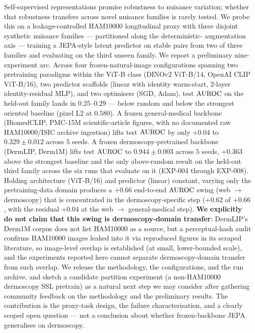 Self-supervised representations promise robustness to nuisance variation; whether
that robustness transfers across novel nuisance families is rarely tested. We
probe this on a leakage-controlled HAM10000 longitudinal proxy with three
disjoint synthetic nuisance families --- partitioned along the deterministic-
augmentation axis --- training a JEPA-style latent predictor on stable pairs
from two of three families and evaluating on the third unseen family. We report
a preliminary nine-experiment arc. Across four frozen-natural-image
configurations spanning two pretraining paradigms within the ViT-B
class (DINOv2 ViT-B/14, OpenAI CLIP ViT-B/16), two predictor
scaffolds (linear with identity warm-start, 2-layer identity-residual
MLP), and two optimisers (SGD, Adam), test $\mathrm{AUROC}$ on the held-out
family lands in $0.25$--$0.29$ --- below random and below the
strongest oriented baseline (pixel L2 at $0.580$). A frozen general-medical
backbone (BiomedCLIP, PMC-15M scientific-article figures, with no
documented raw HAM10000/ISIC archive ingestion) lifts test $\mathrm{AUROC}$ by
only $+0.04$ to $0.329 \pm 0.012$ across $5$ seeds. A frozen
dermoscopy-pretrained backbone
(DermLIP, Derm1M) lifts test $\mathrm{AUROC}$ to $\mathbf{0.944 \pm 0.003}$ across $5$
seeds, $+0.363$ above the strongest baseline and the only above-random result on
the held-out third family across the six runs that evaluate on it
(EXP-004 through EXP-008). Holding architecture (ViT-B/16) and
predictor (linear) constant, varying only the pretraining-data domain
produces a $+0.66$ end-to-end $\mathrm{AUROC}$ swing (web $\to$ dermoscopy)
that is concentrated in the dermoscopy-specific step ($+0.62$ of $+0.66$,
with the residual $+0.04$ at the web $\to$ general-medical step).
\textbf{We explicitly do not claim that this swing is dermoscopy-domain
transfer}: DermLIP's Derm1M corpus does not list HAM10000 as a source, but a
perceptual-hash audit confirms HAM10000 images leaked into it via reproduced
figures in its scraped literature, so image-level overlap is established (at
small, lower-bounded scale), and the experiments reported here cannot separate
dermoscopy-domain transfer from such overlap. We release the methodology, the configurations,
and the run archive, and sketch a candidate partition experiment (a
non-HAM10000 dermoscopy SSL pretrain) as a natural next step we may
consider after gathering community feedback on the methodology and the
preliminary results. The contribution is the
proxy-task design, the failure characterisation, and a clearly scoped open
question --- not a conclusion about whether frozen-backbone JEPA generalises on
dermoscopy.
